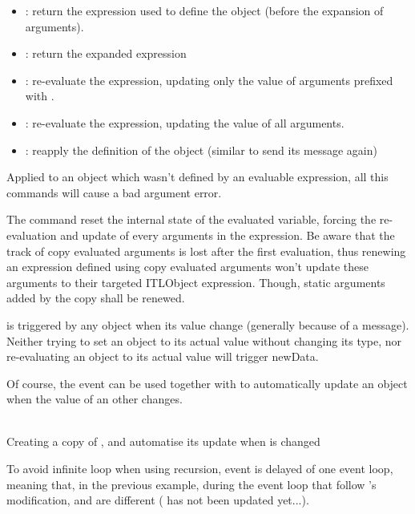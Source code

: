 \begin{itemize}
\item {}: return the expression used to define the object (before the expansion of \OSC{\lowTilde} arguments).
\item {}: return the expanded expression

\item {}: re-evaluate the expression, updating only the value of arguments prefixed with \OSC{\&}.
\item {}: re-evaluate the expression, updating the value of all arguments.
\item {}: reapply the definition of the object (similar to send its  message again)
\end{itemize}

Applied to an object which wasn't defined by an evaluable expression, all this commands will cause a bad argument error.
\smallbreak

The  command reset the internal state of the evaluated variable, forcing the re-evaluation and update of every arguments in the expression. Be aware that the track of copy evaluated arguments is lost after the first evaluation, thus renewing an expression defined using copy evaluated arguments won't update these arguments to their targeted ITLObject expression. Though, static arguments added by the copy shall be renewed.


\label{exprNewData}

 is triggered by any object when its value change (generally because of a  message). Neither trying to set an object to its actual value without changing its type, nor re-evaluating an object to its actual value will trigger newData.

Of course, the  event can be used together with  to automatically update an object when the value of an other changes.

\selayout
\example\\
Creating a copy of , and automatise its update when  is changed

To avoid infinite loop when using recursion,  event is delayed of one event loop, meaning that, in the previous example, during the event loop that follow 's modification,  and  are different ( has not been updated yet...).

